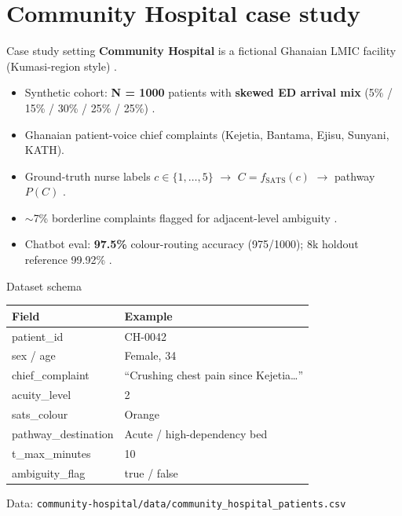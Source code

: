\section{Community Hospital case study}

\begin{frame}{Case study setting}
  \small
  \textbf{Community Hospital} is a fictional Ghanaian LMIC facility (Kumasi-region style) \citep{Rominski2014, Gyedu2016}.

  \vspace{0.15cm}
  \begin{itemize}
    \item Synthetic cohort: \textbf{N = 1000} patients with \textbf{skewed ED arrival mix} (5\% / 15\% / 30\% / 25\% / 25\%) \citep{Mitchell2023, thisstudy2026}.
    \item Ghanaian patient-voice chief complaints (Kejetia, Bantama, Ejisu, Sunyani, KATH).
    \item Ground-truth nurse labels $c \in \{1,\ldots,5\}$ $\to$ $C = f_{\mathrm{SATS}}(c)$ $\to$ pathway $P(C)$ \citep{SATS2012, Rominski2014}.
    \item $\sim$7\% borderline complaints flagged for adjacent-level ambiguity \citep{thisstudy2026}.
    \item Chatbot eval: \textbf{97.5\%} colour-routing accuracy (975/1000); 8k holdout reference 99.92\% \citep{thisstudy2026, Lee2020}.
  \end{itemize}
\end{frame}

\begin{frame}{Dataset schema}
  \footnotesize
  \begin{tabular}{@{}ll@{}}
    \toprule
    Field & Example \\
    \midrule
    patient\_id & CH-0042 \\
    sex / age & Female, 34 \\
    chief\_complaint & ``Crushing chest pain since Kejetia\ldots'' \\
    acuity\_level & 2 \\
    sats\_colour & Orange \\
    pathway\_destination & Acute / high-dependency bed \\
    t\_max\_minutes & 10 \\
    ambiguity\_flag & true / false \\
    \bottomrule
  \end{tabular}

  \vspace{0.2cm}
  Data: \texttt{community-hospital/data/community\_hospital\_patients.csv} \citep{thisstudy2026}
\end{frame}

